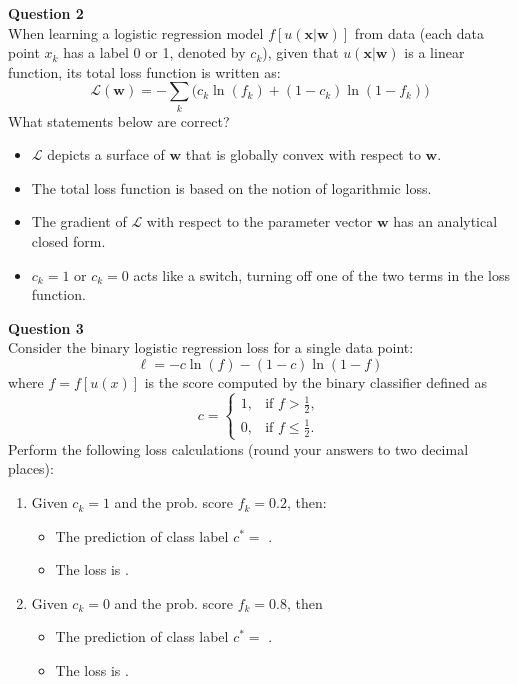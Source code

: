 \documentclass[12pt]{article}
\begin{document}
\textbf{Question 2} \\
When learning a logistic regression model $f[u(\bm{x}|\bm{w})]$ from data (each data point $x_k$ has a label 0 or 1, denoted by $c_k$), given that $u(\bm{x}|\bm{w})$ is a linear function, its total loss function is written as:
\[
\mathcal{L}(\bm{w}) = -\sum_k \Big( c_k\ln(f_k) + (1-c_k)\ln(1-f_k) \Big)
\]
What statements below are correct?
\begin{itemize}
    \item [$\square$] $\mathcal{L}$ depicts a surface of $\bm{w}$ that is globally convex with respect to $\bm{w}$.
    \item [$\square$] The total loss function is based on the notion of logarithmic loss.
    \item [$\square$] The gradient of $\mathcal{L}$ with respect to the parameter vector $\bm{w}$ has an analytical closed form.
    \item [$\square$] $c_k = 1$ or $c_k = 0$ acts like a switch, turning off one of the two terms in the loss function.
\end{itemize}

\bigskip

\textbf{Question 3} \\
Consider the binary logistic regression loss for a single data point:
\[
\ell = -c \ln(f) - (1-c)\ln(1-f)
\]
where $f = f[u(x)]$ is the score computed by the binary classifier defined as
\[
c =
\begin{cases}
1, & \text{if } f > \frac{1}{2},\\[1ex]
0, & \text{if } f \leq \frac{1}{2}.
\end{cases}
\]
Perform the following loss calculations (round your answers to two decimal places):
\begin{enumerate}[label=(\arabic*)]
    \item Given $c_k = 1$ and the prob. score $f_k = 0.2$, then:
    \begin{itemize}
           \item The prediction of class label $c^* =$ \FillRule{1in}. 
           \item The loss is \FillRule{1in}.
    \end{itemize}
    \item Given $c_k = 0$ and the prob. score $f_k = 0.8$, then 
        \begin{itemize}
           \item The prediction of class label $c^* =$ \FillRule{1in}. 
           \item The loss is \FillRule{1in}.
    \end{itemize}
\end{enumerate}
\end{document}
